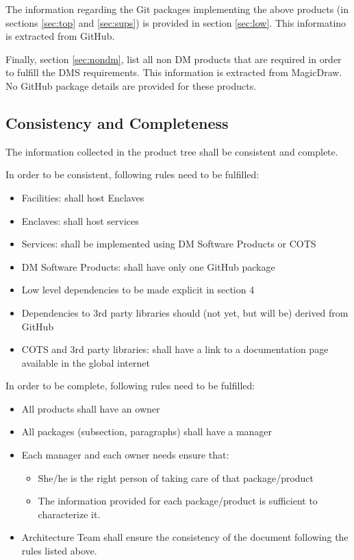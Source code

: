 The information regarding the Git packages implementing the above products (in sections \ref{sec:top} and \ref{sec:sups}) is provided in section \ref{sec:low}. 
This informatino is extracted from GitHub.

Finally, section \ref{sec:nondm}, list all non DM products that are required in order to fulfill the DMS requirements.
This information is extracted from MagicDraw.
No GitHub package details are provided for these products. 


\subsection{Consistency and Completeness}\label{sec:cons-comp}

The information collected in the product tree shall be consistent and complete.

In order to be consistent, following rules need to be fulfilled:

\begin{itemize}
\item Facilities: shall host Enclaves
\item Enclaves: shall host services
\item Services: shall be implemented using DM Software Products or COTS
\item DM Software Products: shall have only one GitHub package
\item Low level dependencies to be made explicit in section 4
\item Dependencies to 3rd party libraries should (not yet, but will be) derived from GitHub
\item COTS and 3rd party libraries: shall have a link to a documentation page available in the global internet
\end{itemize}

In order to be complete, following rules need to be fulfilled:

\begin{itemize}
\item All products shall have an owner
\item All packages (subsection, paragraphs) shall have a manager
\item Each manager and each owner needs ensure that:
\begin{itemize}
\item She/he is the right person of taking care of that package/product
\item The information provided for each package/product is sufficient to characterize it.
\end{itemize}
\item Architecture Team shall ensure the consistency of the document following the rules listed above.
\end{itemize}


